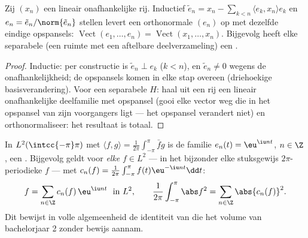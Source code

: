 \begin{proposition}\label{prop:b3:hilbert:gramschmidt}
Zij $(x_n)$ een lineair onafhankelijke rij. Inductief $\tilde e_n
= x_n - \sum_{k<n}\langle e_k, x_n\rangle e_k$ en $e_n = \tilde
e_n/\norm{\tilde e_n}$ stellen levert een orthonormale $(e_n)$ op
met dezelfde eindige opspansels: $\operatorname{Vect}(e_1, \dots,
e_n) = \operatorname{Vect}(x_1, \dots, x_n)$. Bijgevolg heeft
elke separabele  (een ruimte met een aftelbare
 deelverzameling) een
.
\end{proposition}

\begin{proof}
Inductie: per constructie is $\tilde e_n \perp e_k$ ($k < n$), en
$\tilde e_n \neq 0$ wegens de onafhankelijkheid; de opspansels
komen in elke stap overeen (driehoekige basisverandering). Voor
een separabele $H$: haal uit een  rij een lineair
onafhankelijke deelfamilie met  opspansel (gooi elke vector
weg die in het opspansel van zijn voorgangers ligt --- het
opspansel verandert niet) en orthonormaliseer: het resultaat is
totaal.
\end{proof}

\begin{theorem}
\label{thm:b3:hilbert:fourier}
In $L^2(\intcc{-\pi}\pi)$ met $\langle f, g\rangle =
\frac1{2\pi}\int_{-\pi}^\pi \bar fg$ is de familie $e_n(t) =
\eu^{\iu nt}$, $n \in \Z$, een . Bijgevolg geldt
voor \emph{elke} $f \in L^2$ --- in het bijzonder elke
stuksgewijs  $2\pi$-periodieke $f$ --- met $c_n(f) =
\frac1{2\pi}\int_{-\pi}^{\pi}f(t)\eu^{-\iu nt}\dd t$:
\[
f = \sum_{n\in\Z}c_n(f)\,\eu^{\iu nt} \ \ \text{in } L^2,
\qquad
\frac1{2\pi}\int_{-\pi}^{\pi}\abs f^2 =
\sum_{n\in\Z}\abs{c_n(f)}^2 .
\]
Dit bewijst in volle algemeenheid de identiteit van  die
het volume van bachelorjaar 2 zonder bewijs
aannam.
\end{theorem}

